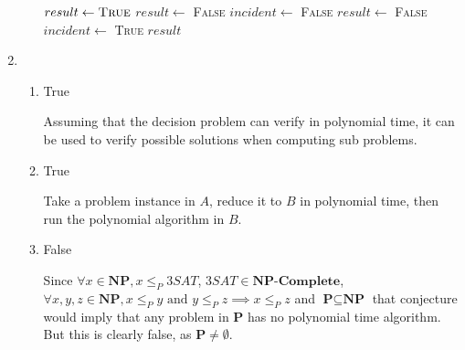 \documentclass[12pt,letterpaper]{article}
\begin{document}
\begin{enumerate}
\begin{enumerate}
          \begin{algorithm}
            \begin{algorithmic}
                \State $result \gets \textsc{True}$
                  \State $result \gets$ \textsc{False}
                \Else
                    \State $incident \gets$ \textsc{False}
                        \State $result \gets$ \textsc{False}
                        \State $incident \gets$ \textsc{True}
                      \EndIf
                    \EndFor
                  \EndFor
                \EndIf
                \State \Return $result$
              \EndFunction
            \end{algorithmic}
          \end{algorithm}

      \end{enumerate}

    \item
      \begin{enumerate}
        \item True

          Assuming that the decision problem can verify in polynomial time,
          it can be used to verify possible solutions when computing sub problems.
        \item True

          Take a problem instance in $A$,
          reduce it to $B$ in polynomial time,
          then run the polynomial algorithm in $B$.
        \item False

          Since
          $\forall x \in \textbf{NP}, x \le_{P} 3SAT$,
          $3SAT \in \textbf{NP-Complete}$,
          $\forall x, y, z \in \textbf{NP}, x \le_{P} y \text{ and } y \le_{P} z \implies x \le_{P} z$ and
          $\textbf{P} \subseteq \textbf{NP}$ that conjecture would imply that
          any problem in \textbf{P} has no polynomial time algorithm.
          But this is clearly false, as $\textbf{P} \ne \emptyset$.
      \end{enumerate}
  \end{enumerate}
\end{document}
